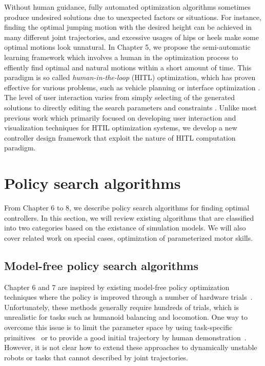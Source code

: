 Without human guidance, fully automated optimization algorithms
sometimes produce undesired solutions due to unexpected factors or
situations.
For instance, finding the optimal jumping motion with the desired
height can be achieved in many different joint trajectories, 
and excessive usages of hips or heels make some optimal motions look unnatural.
In Chapter 5, we propose the semi-automatic learning framework which involves
a human in the optimization process to effiently find optimal and natural
motions within a short amount of time.
This paradigm is so called \emph{human-in-the-loop} (HITL) 
optimization, which has proven effective for various problems, such as
vehicle planning \cite{Waters:1984:IVR} or interface optimization
\cite{Quiroz:2007:IEX}.  The level of user interaction
varies from simply selecting of the generated solutions
\cite{Sims:1991:AEC} to directly editing the search parameters and
constraints \cite{Sreevalsan-Nair:2007:HGE}. Unlike
most previous work which primarily focused on developing user
interaction and visualization techniques for HTIL optimization
systems, we develop a new controller design framework that exploit the nature of
HITL computation paradigm.

\section{Policy search algorithms}
\label{sec:related_policy}
From Chapter 6 to 8, we describe policy search algorithms for
finding optimal controllers.
In this section, we will review existing algorithms that are classified into
two categories based on the existance of simulation models.
We will also cover related work on special cases, optimization of
parameterized motor skills.

\subsection{Model-free policy search algorithms}
Chapter 6 and 7 are inspired by existing model-free policy
optimization techniques where the policy is improved through a number of
hardware trials~\cite{bib-morimoto-standup,bib-kober-primitives}. 
Unfortunately, these methods generally require hundreds of
trials, which is unrealistic for tasks such as humanoid balancing and
locomotion.
One way to overcome this issue is to limit the parameter space by using
task-specific primitives~\cite{bib-nakanishi-adaptation} or to provide a
good initial trajectory by human
demonstration~\cite{bib-atkeson-demonstration}.
However, it is not clear how to extend these approaches to dynamically
unstable robots or tasks that cannot described by joint trajectories.

